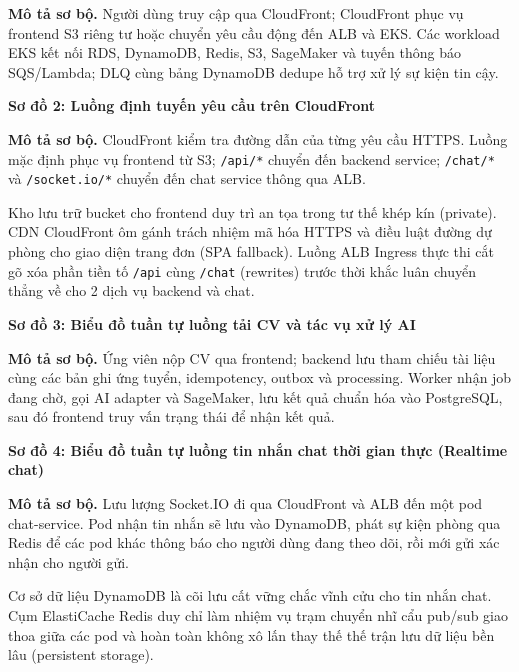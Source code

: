 \textbf{Mô tả sơ bộ.} Người dùng truy cập qua CloudFront; CloudFront
phục vụ frontend S3 riêng tư hoặc chuyển yêu cầu động đến ALB và EKS.
Các workload EKS kết nối RDS, DynamoDB, Redis, S3, SageMaker và tuyến
thông báo SQS/Lambda; DLQ cùng bảng DynamoDB dedupe hỗ trợ xử lý sự kiện
tin cậy.

\vspace{0.5em}\noindent\textbf{Sơ đồ 2: Luồng định tuyến yêu cầu trên
CloudFront}\par

\textbf{Mô tả sơ bộ.} CloudFront kiểm tra đường dẫn của từng yêu cầu
HTTPS. Luồng mặc định phục vụ frontend từ S3; \texttt{/\allowbreak{}api/\allowbreak{}*} chuyển đến
backend service; \texttt{/\allowbreak{}chat/\allowbreak{}*} và \texttt{/\allowbreak{}socket.\allowbreak{}io/\allowbreak{}*} chuyển đến
chat service thông qua ALB.

Kho lưu trữ bucket cho frontend duy trì an tọa trong tư thế khép kín
(private). CDN CloudFront ôm gánh trách nhiệm mã hóa HTTPS và điều luật
đường dự phòng cho giao diện trang đơn (SPA fallback). Luồng ALB Ingress
thực thi cắt gõ xóa phần tiền tố \texttt{/\allowbreak{}api} cùng \texttt{/\allowbreak{}chat}
(rewrites) trước thời khắc luân chuyển thẳng về cho 2 dịch vụ backend và
chat.

\vspace{0.5em}\noindent\textbf{Sơ đồ 3: Biểu đồ tuần tự luồng tải CV và tác vụ xử lý
AI}\par

\textbf{Mô tả sơ bộ.} Ứng viên nộp CV qua frontend; backend lưu tham
chiếu tài liệu cùng các bản ghi ứng tuyển, idempotency, outbox và
processing. Worker nhận job đang chờ, gọi AI adapter và SageMaker, lưu
kết quả chuẩn hóa vào PostgreSQL, sau đó frontend truy vấn trạng thái để
nhận kết quả.

\vspace{0.5em}\noindent\textbf{Sơ đồ 4: Biểu đồ tuần tự luồng tin nhắn chat thời gian thực
(Realtime
chat)}\par

\textbf{Mô tả sơ bộ.} Lưu lượng Socket.IO đi qua CloudFront và ALB đến
một pod chat-service. Pod nhận tin nhắn sẽ lưu vào DynamoDB, phát sự
kiện phòng qua Redis để các pod khác thông báo cho người dùng đang theo
dõi, rồi mới gửi xác nhận cho người gửi.

Cơ sở dữ liệu DynamoDB là cõi lưu cất vững chắc vĩnh cửu cho tin nhắn
chat. Cụm ElastiCache Redis duy chỉ làm nhiệm vụ trạm chuyển nhĩ cẩu
pub/sub giao thoa giữa các pod và hoàn toàn không xô lấn thay thế thế
trận lưu dữ liệu bền lâu (persistent storage).

